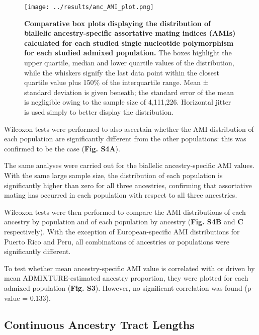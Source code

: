\documentclass[11pt]{article}
\begin{document}
\begin{figure}[p]%
    \centering
    \texttt{[image: ../results/anc\_AMI\_plot.png]} 
    \vspace{.2cm}
    \caption{\textbf{
        Comparative box plots displaying the distribution of biallelic ancestry-specific assortative mating indices (AMIs) calculated for each studied single nucleotide polymorphism for each studied admixed population.
    }
        The boxes highlight the upper quartile, median and lower quartile values of the distribution, while the whiskers signify the last data point within the closest quartile value plus 150\% of the interquartile range. Mean ± standard deviation is given beneath; the standard error of the mean is negligible owing to the sample size of 4,111,226. Horizontal jitter is used simply to better display the distribution.
    }
\end{figure}


Wilcoxon tests were performed to also ascertain whether the AMI distribution of each population are significantly different from the other populations: this was confirmed to be the case (\textbf{Fig. S4A}). 

The same analyses were carried out for the biallelic ancestry-specific AMI values. With the same large sample size, the distribution of each population is significantly higher than zero for all three ancestries, confirming that assortative mating has occurred in each population with respect to all three ancestries.

Wilcoxon tests were then performed to compare the AMI distributions of each ancestry by population and of each population by ancestry (\textbf{Fig. S4B} and \textbf{C} respectively). With the exception of European-specific AMI distributions for Puerto Rico and Peru, all combinations of ancestries or populations were significantly different. 

To test whether mean ancestry-specific AMI value is correlated with or driven by mean ADMIXTURE-estimated ancestry proportion, they were plotted for each admixed population (\textbf{Fig. S3}). However, no significant correlation was found (p-value = 0.133). 





\subsection{Continuous Ancestry Tract Lengths}
\end{document}
